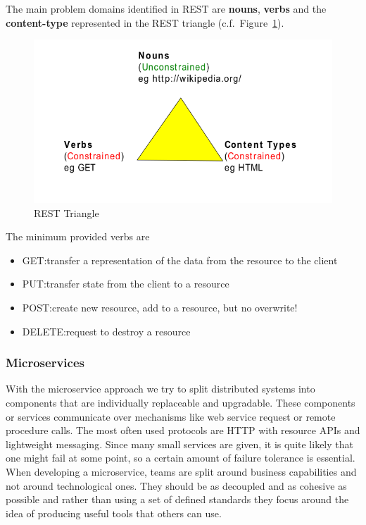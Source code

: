 The main problem domains identified in REST are \textbf{nouns}, \textbf{verbs} and the \textbf{content-type} represented in the REST triangle (c.f.\ Figure~\ref{fig:rest_triangle}).
\begin{figure}[h]
  \centering
  \includegraphics[width=.7\textwidth]{images/rest_triangle.png}
  \caption{REST Triangle}\label{fig:rest_triangle}
\end{figure}

The minimum provided verbs are 
\begin{itemize}[noitemsep, topsep=0pt]
  \item GET:\@ transfer a representation of the data from the resource to the client
  \item PUT:\@ transfer state from the client to a resource
  \item POST:\@ create new resource, add to a resource, but no overwrite!
  \item DELETE:\@ request to destroy a resource
\end{itemize}

\subsubsection{Microservices}
With the microservice approach we try to split distributed systems into components that are individually replaceable and upgradable.
These components or services communicate over mechanisms like web service request or remote procedure calls. 
The most often used protocols are HTTP with resource APIs and lightweight messaging.
Since many small services are given, it is quite likely that one might fail at some point, so a certain amount of failure tolerance is essential.
When developing a microservice, teams are split around business capabilities and not around technological ones.
They should be as decoupled and as cohesive as possible and rather than using a set of defined standards they focus around the idea of producing useful tools that others can use.

